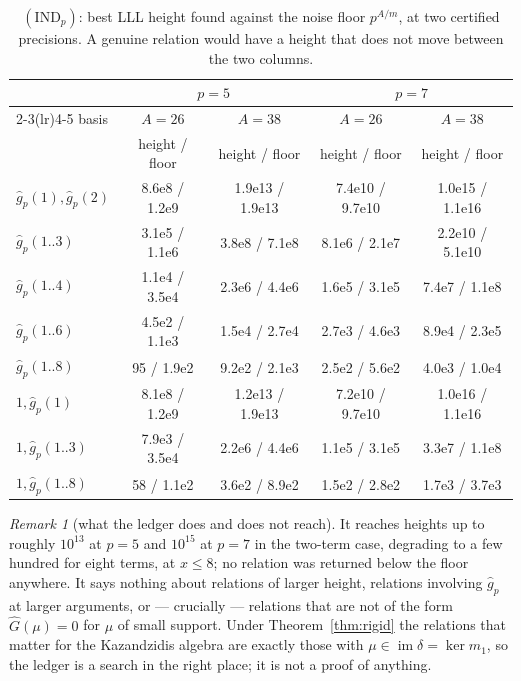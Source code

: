 \documentclass[11pt,reqno]{article}
\newcommand{\gh}{\widehat{g}_p}
\DeclareMathOperator{\im}{im}
\theoremstyle{plain}
\theoremstyle{definition}
\theoremstyle{remark}
\newtheorem{remark}[theorem]{Remark}
\numberwithin{equation}{section}
\begin{document}
\begin{table}[h]
\centering\small
\caption{$(\mathrm{IND}_p)$: best LLL height found against the noise floor
$p^{A/m}$, at two certified precisions.  A genuine relation would have a height
that does not move between the two columns.}
\label{tab:ind}
\begin{tabular}{@{}lcccc@{}}
\toprule
& \multicolumn{2}{c}{$p=5$} & \multicolumn{2}{c}{$p=7$}\\
\cmidrule(lr){2-3}\cmidrule(lr){4-5}
basis & $A=26$ & $A=38$ & $A=26$ & $A=38$\\
      & height / floor & height / floor & height / floor & height / floor\\
\midrule
$\gh(1),\gh(2)$          & 8.6e8 / 1.2e9 & 1.9e13 / 1.9e13 & 7.4e10 / 9.7e10 & 1.0e15 / 1.1e16\\
$\gh(1..3)$              & 3.1e5 / 1.1e6 & 3.8e8 / 7.1e8   & 8.1e6 / 2.1e7   & 2.2e10 / 5.1e10\\
$\gh(1..4)$              & 1.1e4 / 3.5e4 & 2.3e6 / 4.4e6   & 1.6e5 / 3.1e5   & 7.4e7 / 1.1e8\\
$\gh(1..6)$              & 4.5e2 / 1.1e3 & 1.5e4 / 2.7e4   & 2.7e3 / 4.6e3   & 8.9e4 / 2.3e5\\
$\gh(1..8)$              & 95 / 1.9e2    & 9.2e2 / 2.1e3   & 2.5e2 / 5.6e2   & 4.0e3 / 1.0e4\\
\midrule
$1,\gh(1)$               & 8.1e8 / 1.2e9 & 1.2e13 / 1.9e13 & 7.2e10 / 9.7e10 & 1.0e16 / 1.1e16\\
$1,\gh(1..3)$            & 7.9e3 / 3.5e4 & 2.2e6 / 4.4e6   & 1.1e5 / 3.1e5   & 3.3e7 / 1.1e8\\
$1,\gh(1..8)$            & 58 / 1.1e2    & 3.6e2 / 8.9e2   & 1.5e2 / 2.8e2   & 1.7e3 / 3.7e3\\
\bottomrule
\end{tabular}
\end{table}

\begin{remark}[what the ledger does and does not reach]
It reaches heights up to roughly $10^{13}$ at $p=5$ and $10^{15}$ at $p=7$ in the
two-term case, degrading to a few hundred for eight terms, at $x\le8$; no
relation was returned below the floor anywhere.  It says nothing about
relations of larger height, relations
involving $\gh$ at larger arguments, or --- crucially --- relations that are not
of the form $\widehat G(\mu)=0$ for $\mu$ of small support.  Under
Theorem~\ref{thm:rigid} the relations that matter for the Kazandzidis algebra are
exactly those with $\mu\in\im\delta=\ker m_1$, so the ledger is a search in the
right place; it is not a proof of anything.
\end{remark}
\end{document}
